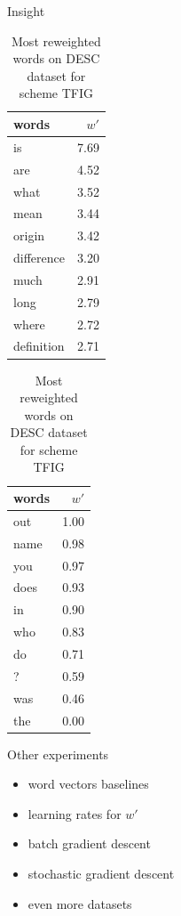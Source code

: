 \documentclass[xcolor={table}]{beamer}
\begin{document}
\begin{frame}[fragile]{Insight}
\small
\begin{table}[H]
    \centering
    \begin{minipage}{.4\linewidth}
      \centering
        \begin{tabular}{lr}
\toprule
      words &  $w'$ \\
\midrule
         is &  7.69 \\
        are &  4.52 \\
       what &  3.52 \\
       mean &  3.44 \\
     origin &  3.42 \\
 difference &  3.20 \\
       much &  2.91 \\
       long &  2.79 \\
      where &  2.72 \\
 definition &  2.71 \\
\bottomrule
\end{tabular}

    \end{minipage}
    \begin{minipage}{.4\linewidth}
      \centering
        \begin{tabular}{lr}
\toprule
words &  $w'$ \\
\midrule
  out &  1.00 \\
 name &  0.98 \\
  you &  0.97 \\
 does &  0.93 \\
   in &  0.90 \\
  who &  0.83 \\
   do &  0.71 \\
    ? &  0.59 \\
  was &  0.46 \\
  the &  0.00 \\
\bottomrule
\end{tabular}

    \end{minipage} 
    \caption{Most reweighted words on DESC dataset for scheme TFIG}
    \label{tab:words:TREC:tfig}
\end{table}
\end{frame}





\begin{frame}{Other experiments}
    \begin{itemize}
        \item word vectors baselines
        \item learning rates for $w'$
        \item batch gradient descent
        \item stochastic gradient descent
        \item even more datasets
    \end{itemize}
\end{frame} 
\end{document}
